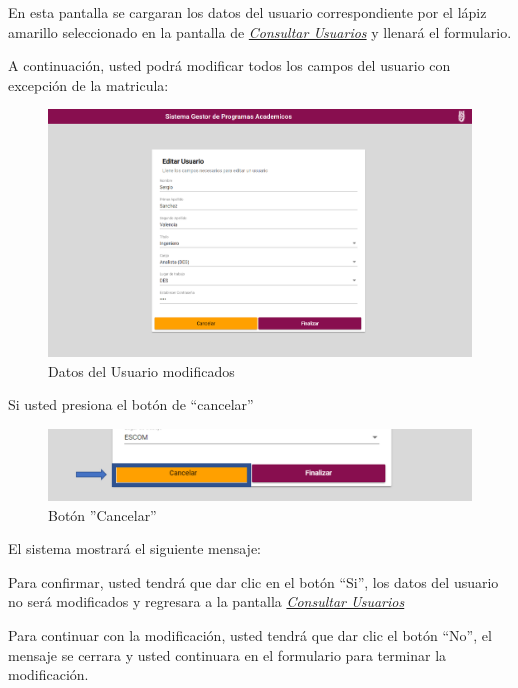                 En esta pantalla se cargaran los datos del usuario correspondiente por el lápiz amarillo seleccionado en la pantalla de \hyperlink{consultarUs}{\textit{Consultar Usuarios}} y llenará el formulario.
            
                A continuación, usted podrá modificar todos los campos del usuario con excepción de la matricula:
                \begin{figure}[!hbtp]
                    \centering
                    \hypertarget{modif}{\includegraphics[width=0.7\linewidth]{images/SP5/Editar-Usuario-Des}}
                    \caption{Datos del Usuario modificados}
                    \label{modif}
                \end{figure}
                
                Si usted presiona el botón de “cancelar”
                
                \begin{figure}[!hbtp]
                    \centering
                    \hypertarget{cancel2}{\includegraphics[width=0.7\linewidth]{images/SP5/BtnCancelar2}}
                    \caption{Botón ''Cancelar''}
                    \label{cancel2}
                \end{figure}
                
                El sistema mostrará el siguiente mensaje:
                
                Para confirmar, usted tendrá que dar clic en el botón “Si”, los datos del usuario no será modificados  y regresara a la pantalla \hyperlink{consultarUs}{\textit{Consultar Usuarios}}
            
                Para continuar con la modificación, usted tendrá que  dar clic el botón “No”, el mensaje se cerrara y usted continuara en el formulario para terminar la modificación.
                
